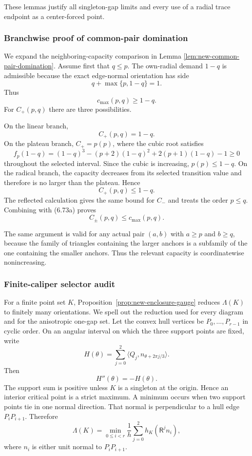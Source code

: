 These lemmas justify all singleton-gap limits and every use of a radial trace
endpoint as a center-forced point.

\subsubsection{Branchwise proof of common-pair domination}

We expand the neighboring-capacity comparison in Lemma
\ref{lem:new-common-pair-domination}.  Assume first that $q\le p$.
The own-radial demand $1-q$ is admissible because the exact edge-normal
orientation has side
\[
 q+\max\{p,1-q\}=1.
\]
Thus
\[
 c_{\max}(p,q)\ge1-q.
 \tag{6.73a}
\]
For $C_+(p,q)$ there are three possibilities.

On the linear branch,
\[
 C_+(p,q)=1-q.
\]
On the plateau branch, $C_+=p(p)$, where the cubic root satisfies
\[
 f_p(1-q)
 =(1-q)^3-(p+2)(1-q)^2+2(p+1)(1-q)-1\ge0
\]
throughout the selected interval.  Since the cubic is increasing,
$p(p)\le1-q$.  On the radical branch, the capacity decreases from its
selected transition value and therefore is no larger than the plateau.  Hence
\[
 C_+(p,q)\le1-q.
\]
The reflected calculation gives the same bound for $C_-$ and treats the order
$p\le q$.  Combining with (6.73a) proves
\[
 C_\pm(p,q)\le c_{\max}(p,q).
\]

The same argument is valid for any actual pair $(a,b)$ with $a\ge p$ and
$b\ge q$, because the family of triangles containing the larger anchors is a
subfamily of the one containing the smaller anchors.  Thus the relevant
capacity is coordinatewise nonincreasing.

\subsubsection{Finite-caliper selector audit}

For a finite point set $K$, Proposition~\ref{prop:new-enclosure-gauge} reduces
$\Lambda(K)$ to finitely many orientations.  We spell out the reduction used
for every diagram and for the anisotropic one-gap set.  Let the convex hull
vertices be $P_0,\ldots,P_{r-1}$ in cyclic order.  On an angular interval on
which the three support points are fixed, write
\[
 H(\theta)=
 \sum_{j=0}^2
 \langle Q_j,n_{\theta+2\pi j/3}\rangle.
\]
Then
\[
 H''(\theta)=-H(\theta).
\]
The support sum is positive unless $K$ is a singleton at the origin.  Hence an
interior critical point is a strict maximum.  A minimum occurs when two
support points tie in one normal direction.  That normal is perpendicular to
a hull edge $P_iP_{i+1}$.  Therefore
\[
 \Lambda(K)=
 \min_{0\le i<r}
 \frac1h
 \sum_{j=0}^2
 h_K(\mathsf R^jn_i),
 \tag{6.73b}
\]
where $n_i$ is either unit normal to $P_iP_{i+1}$.

